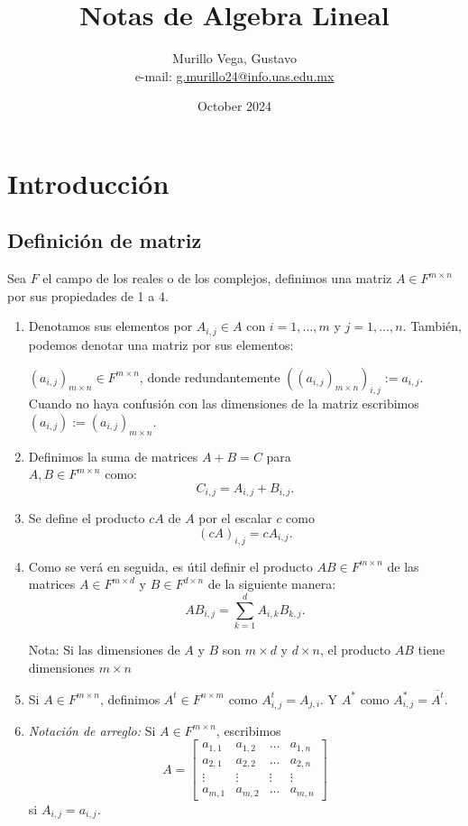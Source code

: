 \documentclass{article}
\title{Notas de Algebra Lineal}
\author{Murillo Vega, Gustavo \\ e-mail:
\href{mailto:g.murillo24@info.uas.edu.mx}{g.murillo24@info.uas.edu.mx}}
\date{October 2024}
\begin{document}
\maketitle

\section{Introducción}
\subsection{Definición de matriz}
Sea ${F}$ el campo de los reales o de los complejos, definimos una matriz $A\in {F}^{m\times n}$ por sus propiedades de 1 a 4.
\begin{enumerate}
    \item Denotamos sus elementos por $A_{i,j}\in A$ con  $i=1,\ldots,m$ y $j=1,\ldots,n$. También, podemos denotar una matriz por sus elementos:
    
    $(a_{i,j})_{m\times n} \in {F}^{m\times n}$, donde redundantemente $((a_{i,j})_{m\times n})_{i,j} := a_{i,j}$.\\
    Cuando no haya confusión con las dimensiones de la matriz
    escribimos\\ $(a_{i,j}) := (a_{i,j})_{m\times n}$.
    
    \item Definimos la suma de matrices $A+B = C$ para
    \\ $A, B \in {F}^{m\times n}$ como:
    $$C_{i,j}=A_{i,j} + B_{i,j}.$$

    \item Se define el producto $cA$ de $A$ por el escalar $c$
    como $$(cA)_{i,j} = cA_{i,j}.$$
    
    \item Como se verá en seguida, es útil definir el producto
    $AB\in {F}^{m\times n}$ de las matrices $A\in {F}^{m\times d}$ y
    $B \in {F}^{d\times n}$ de la siguiente manera:
    $$AB_{i,j} = \sum^d_{k=1} A_{i,k} B_{k,j}.$$
    
    Nota: Si las dimensiones de $A$ y $B$ son $m\times d$
    y $d\times n$, el producto $AB$ tiene dimensiones $m\times n$

    \item Si $A\in F^{m\times n}$, definimos $A^t \in F^{n\times m}$
    como $A^t_{i,j} = A_{j,i}$. Y $A^*$ como
    $A^*_{i,j} = \overline{A^t}$.

    \item \textit{Notación de arreglo:} Si
    $A\in {F}^{m\times n}$, escribimos
    $$A = \begin{bmatrix}
        a_{1,1} & a_{1,2} & \ldots & a_{1, n} \\
        a_{2,1} & a_{2,2} & \ldots & a_{2, n} \\
        \vdots & \vdots & \vdots & \vdots \\
        a_{m,1} & a_{m,2} & \ldots & a_{m, n}
    \end{bmatrix}$$
    si $A_{i,j} = a_{i,j}$.
\end{enumerate}
\end{document}
